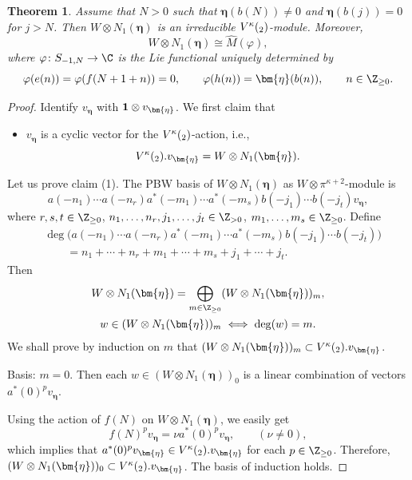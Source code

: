 \documentclass[pdftex]{sigma}
\numberwithin{equation}{section}
\newtheorem{Theorem}{Theorem}[section]
\theoremstyle{definition}
\newcommand{\1}{\textbf{1}}
\begin{document}
\begin{Theorem} \label{prvi-teorem} Assume that $N >0$ such that $\bm{\eta}(b(N)) \ne 0$ and $\bm{\eta}(b(j)) =0$ for $j >N$.
Then $W \otimes N_1(\bm{\eta})$ is an irreducible $V^{\kappa}(\sl_2)$-module. Moreover,
 \[ W \otimes N_1(\bm{\eta}) \cong \widehat{M}(\varphi), \]
where $\varphi \colon S_{-1, N} \rightarrow \C$ is the Lie functional uniquely determined by
 \[ \varphi(e(n)) = \varphi(f(N+1+n)) = 0, \qquad \varphi(h(n)) = \bm{\eta}(b(n)), \qquad n \in {\Z}_{\ge 0}. \]
\end{Theorem}
\begin{proof}
Identify $v_{\bm{\eta}}$ with $ {\bf 1} \otimes v_{\bm{\eta}}$.
We first claim that
\begin{itemize}\itemsep=0pt
\item[(1)] $v_{\bm{\eta}}$ is a cyclic vector for the $V^{\kappa}(\sl_2)$-action, i.e.,
 \[ V^{\kappa}(\sl_2). v_{\bm{\eta}} = W \otimes N_1(\bm{\eta}). \]
\end{itemize}
Let us prove claim (1). The PBW basis of $W \otimes N_1(\bm{\eta})$ as $W \otimes \pi^{\kappa +2}$-module is
\[ a(-n_1) \cdots a(-n_r) a^*(-m_1) \cdots a^* (-m_s) b(-j_1) \cdots b(-j_t) v_{\bm{\eta}}, \]
where $r,s,t \in {\Z}_{\ge 0}$, $n_1, \dots, n_r, j_1,\dots, j_t \in {\Z}_{>0}$, $m_1, \dots, m_s \in {\Z}_{\ge 0}$.
Define
\[
\begin{aligned}
&\deg\bigl(a(-n_1)\cdots a(-n_r)a^*(-m_1)\cdots a^*(-m_s)
 b(-j_1)\cdots b(-j_t)\bigr)\\
&\qquad = n_1+\cdots+n_r+m_1+\cdots+m_s+j_1+\cdots+j_t.
\end{aligned}
\]
Then
\begin{gather*}
 W \otimes N_1(\bm{\eta}) = \bigoplus_{m \in {\Z}_{\ge 0} } ( W \otimes N_1(\bm{\eta}) )_m, \\
w \in ( W \otimes N_1(\bm{\eta}) )_m \iff \deg (w) = m.
\end{gather*}
We shall prove by induction on $m$ that $( W \otimes N_1(\bm{\eta}) )_m \subset V^{\kappa}(\sl_2). v_{\bm{\eta}}$.

Basis: $m = 0$.
Then each $w \in ( W \otimes N_1(\bm{\eta}) )_0$ is a linear combination of vectors
$a^*(0) ^p v_{\bm{\eta}}$.


Using the action of $f(N)$ on $W \otimes N_1(\bm{\eta})$, we easily get \[ f(N) ^p v_{\bm{\eta}} = \nu a^*(0) ^p v_{\bm{\eta}}, \qquad (\nu \ne 0), \]
which implies that $a^*(0) ^p v_{\bm{\eta}} \in V^{\kappa}(\sl_2). v_{\bm{\eta}}$ for each $p \in {\Z}_{\ge 0}$. Therefore,
$( W \otimes N_1(\bm{\eta}) )_0 \subset V^{\kappa}(\sl_2). v_{\bm{\eta}}$. The basis of induction holds.


\end{proof}
\end{document}
